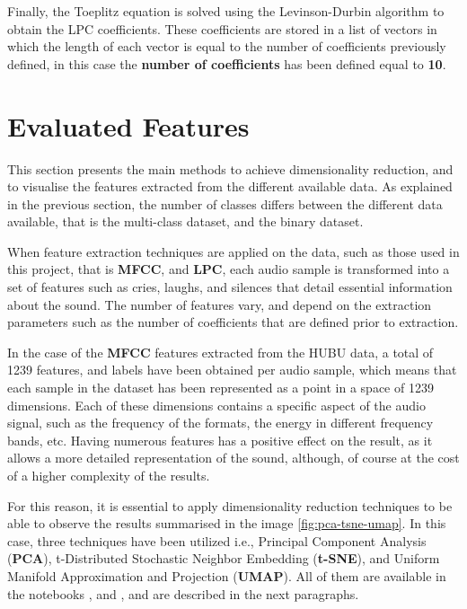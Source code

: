 Finally, the Toeplitz equation is solved using the Levinson-Durbin algorithm to obtain the LPC coefficients. These coefficients are stored in a list of vectors in which the length of each vector is equal to the number of coefficients previously defined, in this case the \textbf{number of coefficients} has been defined equal to \textbf{10}.  


\section{Evaluated Features}

This section presents the main methods to achieve dimensionality reduction, and to visualise the features extracted from the different available data. As explained in the previous section, the number of classes differs between the different data available, that is the multi-class dataset, and the binary dataset. 

When feature extraction techniques are applied on the data, such as those used in this project, that is \textbf{MFCC}, and \textbf{LPC}, each audio sample is transformed into a set of features such as cries, laughs, and silences that detail essential information about the sound. The number of features vary, and depend on the extraction parameters such as the number of coefficients that are defined prior to extraction. 

In the case of the \textbf{MFCC} features extracted from the HUBU data, a total of 1239 features, and labels have been obtained per audio sample, which means that each sample in the dataset has been represented as a point in a space of 1239 dimensions. Each of these dimensions contains a specific aspect of the audio signal, such as the frequency of the formats, the energy in different frequency bands, etc. Having numerous features has a positive effect on the result, as it allows a more detailed representation of the sound, although, of course at the cost of a higher complexity of the results. 

For this reason, it is essential to apply dimensionality reduction techniques to be able to observe the results summarised in the image \ref{fig:pca-tsne-umap}. In this case, three techniques have been utilized i.e., Principal Component Analysis (\textbf{PCA}), t-Distributed Stochastic Neighbor Embedding (\textbf{t-SNE}), and Uniform Manifold Approximation and Projection (\textbf{UMAP}). All of them are available in the notebooks , and , and are described in the next paragraphs.  


